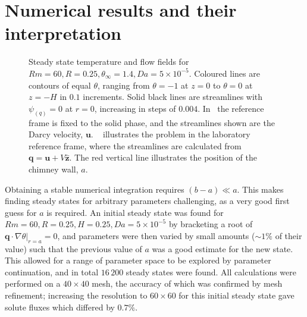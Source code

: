 \documentclass[11pt,twocolumn]{article}
\begin{document}
\section{Numerical results and their interpretation}
\label{sec:results}

\begin{figure}[t!]
\centering
\captionsetup[subfigure]{position=top,singlelinecheck=off,justification=raggedright, aboveskip=-14pt,belowskip=0pt}
\begin{subfigure}[t]{.48\linewidth}
	\centering
   	\setlength\figureheight{5cm} 
	\setlength\figurewidth{6.5cm}
	\caption{}
	
    	\label{subfig:steady-state-darcy}
 \end{subfigure}
 \quad
 \begin{subfigure}[t]{.48\linewidth}
    	\centering
    	\setlength\figureheight{5cm} 
	\setlength\figurewidth{6.5cm}
	\caption{}
	 
    	\label{subfig:steady-state-q}
 \end{subfigure}
 
 \setlength{\abovecaptionskip}{-10pt} %
\setlength{\belowcaptionskip}{-7pt} %
 
 \caption{Steady state temperature and flow fields for $Rm=60, R=0.25, \theta_\infty=1.4, Da=5\times10^{-5}$. Coloured lines are contours of equal $\theta$, ranging from $\theta=-1$ at $z=0$ to $\theta=0$ at $z=-H$ in $0.1$ increments. Solid black lines are streamlines with $\psi_{(q)} = 0$ at $r=0$, increasing in steps of $0.004$. In~ the reference frame is fixed to the solid phase, and the streamlines shown are the Darcy velocity, $\mathbf{u}$. ~  illustrates the problem in the laboratory reference frame, where the streamlines are calculated from $\mathbf{q} = \mathbf{u} + V \mathbf{\hat{z}}$. The red vertical line illustrates the position of the chimney wall, $a$.}
\label{fig:typical-steady-states}
 \end{figure}


Obtaining a stable numerical integration requires $(b-a) \ll a$. This makes finding steady states for arbitrary parameters challenging, as a very good first guess for $a$ is required. An initial steady state was found for $Rm = 60, R=0.25, H=0.25, Da=5\times 10^{-5}$ by bracketing a root of $\left. \mathbf{q} \cdot \nabla \theta \right|_{r=a} = 0$, and parameters were then varied by small amounts ($\sim 1\%$ of their value) such that the previous value of $a$ was a good estimate for the new state. This allowed for a range of parameter space to be explored by parameter continuation, and in total $16\,200$ steady states were found. All calculations were performed on a $40\times40$ mesh, the accuracy of which was confirmed by mesh refinement; increasing the resolution to $60\times60$ for this initial steady state gave solute fluxes which differed by $0.7\%$.
\end{document}
